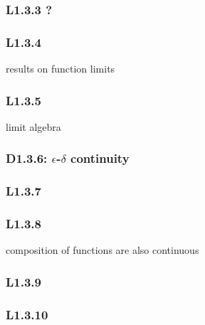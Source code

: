 \documentclass{article}
\begin{document}
\begin{multicols*}{3}
\subsubsection*{L1.3.3 ?}

\subsubsection*{L1.3.4}
results on function limits

\subsubsection*{L1.3.5}
limit algebra

\subsubsection*{D1.3.6: $\epsilon$-$\delta$ continuity}

\subsubsection*{L1.3.7}

\subsubsection*{L1.3.8}
composition of functions are also continuous

\subsubsection*{L1.3.9}

\subsubsection*{L1.3.10}

\newpage

\end{multicols*}
\end{document}
